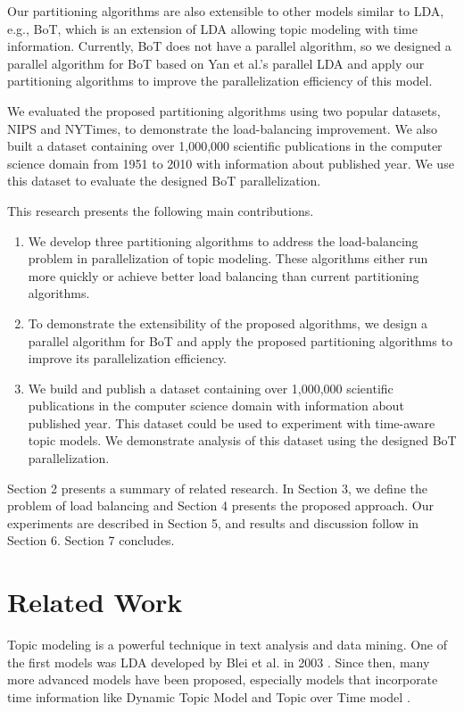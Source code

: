 \documentclass[10pt,conference]{IEEEtran}
\begin{document}
Our partitioning algorithms are also extensible to other models similar to LDA, e.g., BoT, which is an extension of LDA allowing topic modeling with time information. Currently, BoT does not have a parallel algorithm, so we designed a parallel algorithm for BoT based on Yan et al.'s parallel LDA and apply our partitioning algorithms to improve the parallelization efficiency of this model.

We evaluated the proposed partitioning algorithms using two popular datasets, NIPS and NYTimes, to demonstrate the load-balancing improvement. We also built a dataset containing over 1,000,000 scientific publications in the computer science domain from 1951 to 2010 with information about published year. We use this dataset to evaluate the designed BoT parallelization.

This research presents the following main contributions.
\begin{enumerate}
  \item We develop three partitioning algorithms to address the load-balancing problem in parallelization of topic modeling. These algorithms either run more quickly or achieve better load balancing than current partitioning algorithms.
  \item To demonstrate the extensibility of the proposed algorithms, we design a parallel algorithm for BoT and apply the proposed partitioning algorithms to improve its parallelization efficiency.
  \item We build and publish a dataset containing over 1,000,000 scientific publications in the computer science domain with information about published year. This dataset could be used to experiment with time-aware topic models. We demonstrate analysis of this dataset using the designed BoT parallelization.
\end{enumerate}

Section 2 presents a summary of related research. In Section 3, we define the problem of load balancing and Section 4 presents the proposed approach. Our experiments are described in Section 5, and results and discussion follow in Section 6. Section 7 concludes.
\section{Related Work}
Topic modeling is a powerful technique in text analysis and data mining. One of the first models was LDA developed by Blei et al. in 2003 \cite{blei2003latent}. Since then, many more advanced models have been proposed, especially models that incorporate time information like Dynamic Topic Model \cite{blei2006dynamic} and Topic over Time model \cite{wang2006topics}.
\end{document}
